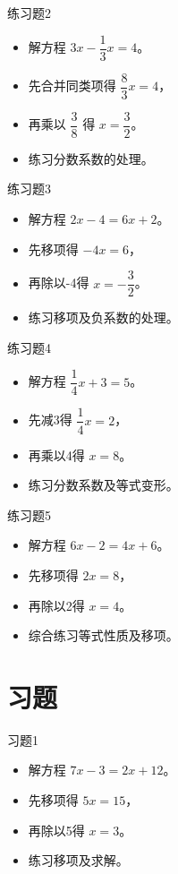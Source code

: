 \documentclass{ctexbeamer}
\begin{document}
\begin{frame}{练习题2}
  \begin{itemize}
    \item 解方程 \(3x - \dfrac{1}{3}x = 4\)。
    \item 先合并同类项得 \(\dfrac{8}{3}x = 4\)，
    \item 再乘以 \(\dfrac{3}{8}\) 得 \(x = \dfrac{3}{2}\)。
    \item 练习分数系数的处理。
  \end{itemize}
\end{frame}

\begin{frame}{练习题3}
  \begin{itemize}
    \item 解方程 \(2x - 4 = 6x + 2\)。
    \item 先移项得 \(-4x = 6\)，
    \item 再除以-4得 \(x = -\dfrac{3}{2}\)。
    \item 练习移项及负系数的处理。
  \end{itemize}
\end{frame}

\begin{frame}{练习题4}
  \begin{itemize}
    \item 解方程 \(\dfrac{1}{4}x + 3 = 5\)。
    \item 先减3得 \(\dfrac{1}{4}x = 2\)，
    \item 再乘以4得 \(x = 8\)。
    \item 练习分数系数及等式变形。
  \end{itemize}
\end{frame}

\begin{frame}{练习题5}
  \begin{itemize}
    \item 解方程 \(6x - 2 = 4x + 6\)。
    \item 先移项得 \(2x = 8\)，
    \item 再除以2得 \(x = 4\)。
    \item 综合练习等式性质及移项。
  \end{itemize}
\end{frame}

\section{习题}

\begin{frame}{习题1}
  \begin{itemize}
    \item 解方程 \(7x - 3 = 2x + 12\)。
    \item 先移项得 \(5x = 15\)，
    \item 再除以5得 \(x = 3\)。
    \item 练习移项及求解。
  \end{itemize}
\end{frame}
\end{document}
